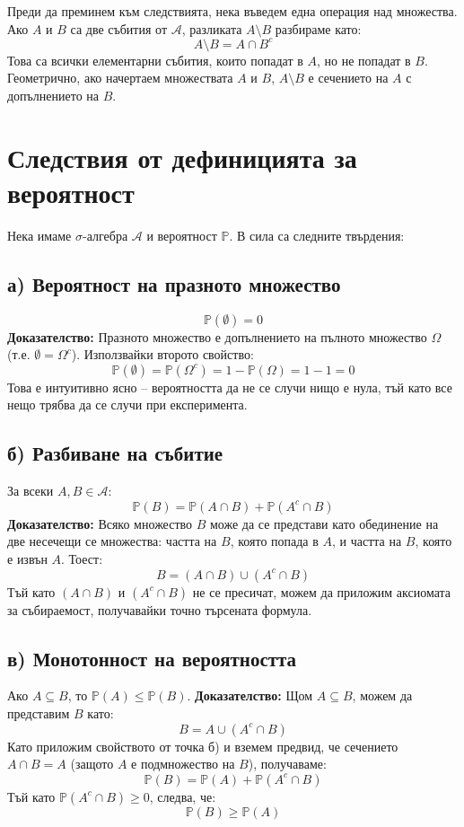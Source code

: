 \documentclass{article}
\begin{document}
Преди да преминем към следствията, нека въведем една операция над множества. Ако $A$ и $B$ са две събития от $\mathcal{A}$, разликата $A \setminus B$ разбираме като:
\[ A \setminus B = A \cap B^c \]
Това са всички елементарни събития, които попадат в $A$, но не попадат в $B$. Геометрично, ако начертаем множествата $A$ и $B$, $A \setminus B$ е сечението на $A$ с допълнението на $B$.

\section{Следствия от дефиницията за вероятност}

Нека имаме $\sigma$-алгебра $\mathcal{A}$ и вероятност $\mathbb{P}$. В сила са следните твърдения:

\subsection{а) Вероятност на празното множество}
\[ \mathbb{P}(\emptyset) = 0 \]
\textbf{Доказателство:} Празното множество е допълнението на пълното множество $\Omega$ (т.е. $\emptyset = \Omega^c$). Използвайки второто свойство:
\[ \mathbb{P}(\emptyset) = \mathbb{P}(\Omega^c) = 1 - \mathbb{P}(\Omega) = 1 - 1 = 0 \]
Това е интуитивно ясно – вероятността да не се случи нищо е нула, тъй като все нещо трябва да се случи при експеримента.

\subsection{б) Разбиване на събитие}
За всеки $A, B \in \mathcal{A}$:
\[ \mathbb{P}(B) = \mathbb{P}(A \cap B) + \mathbb{P}(A^c \cap B) \]
\textbf{Доказателство:} Всяко множество $B$ може да се представи като обединение на две несечещи се множества: частта на $B$, която попада в $A$, и частта на $B$, която е извън $A$. Тоест:
\[ B = (A \cap B) \cup (A^c \cap B) \]
Тъй като $(A \cap B)$ и $(A^c \cap B)$ не се пресичат, можем да приложим аксиомата за събираемост, получавайки точно търсената формула.

\subsection{в) Монотонност на вероятността}
Ако $A \subseteq B$, то $\mathbb{P}(A) \le \mathbb{P}(B)$.
\textbf{Доказателство:} Щом $A \subseteq B$, можем да представим $B$ като:
\[ B = A \cup (A^c \cap B) \]
Като приложим свойството от точка б) и вземем предвид, че сечението $A \cap B = A$ (защото $A$ е подмножество на $B$), получаваме:
\[ \mathbb{P}(B) = \mathbb{P}(A) + \mathbb{P}(A^c \cap B) \]
Тъй като $\mathbb{P}(A^c \cap B) \ge 0$, следва, че:
\[ \mathbb{P}(B) \ge \mathbb{P}(A) \]
\end{document}
